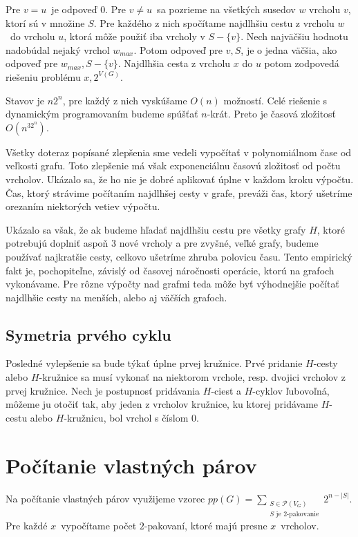 Pre $v = u$ je odpoveď $0$. Pre $v \neq u$ sa pozrieme na všetkých susedov $w$ vrcholu $v$,
ktorí sú v množine $S$. Pre každého z nich spočítame najdlhšiu cestu z vrcholu $w$ do vrcholu
$u$, ktorá môže použiť iba vrcholy v $S - \{v\}$. Nech najväčšiu hodnotu nadobúdal nejaký vrchol
$w_{max}$. Potom odpoveď pre $v, S$, je o jedna väčšia, ako odpoveď pre $w_{max}, S - \{v\}$.
Najdlhšia cesta z vrcholu $x$ do $u$ potom zodpovedá riešeniu problému $x, 2^{V(G)}$.

Stavov je $n2^n$, pre každý z nich vyskúšame $O(n)$ možností. Celé riešenie s dynamickým
programovaním budeme spúšťať $n$-krát. Preto je časová zložitosť $O(n^32^n)$.

Všetky doteraz popísané zlepšenia sme vedeli vypočítať v polynomiálnom čase od veľkosti grafu.
Toto zlepšenie má však exponenciálnu časovú zložitosť od počtu vrcholov. Ukázalo sa,
že ho nie je dobré aplikovať úplne v každom kroku výpočtu. Čas, ktorý strávime počítaním
najdlhšej cesty v grafe, preváži čas, ktorý ušetríme orezaním niektorých vetiev výpočtu.

Ukázalo sa však, že ak budeme hľadať najdlhšiu cestu pre všetky grafy $H$, ktoré potrebujú
doplniť aspoň $3$ nové vrcholy a pre zvyšné, veľké grafy, budeme používať najkratšie cesty,
celkovo ušetríme zhruba polovicu času. Tento empirický fakt je, pochopiteľne, závislý od
časovej náročnosti operácie, ktorú na grafoch vykonávame. Pre rôzne výpočty nad grafmi
teda môže byť výhodnejšie počítať najdlhšie cesty na menších, alebo aj väčších grafoch.

\subsection{Symetria prvého cyklu}

Posledné vylepšenie sa bude týkať úplne prvej kružnice. Prvé pridanie $H$-cesty alebo $H$-kružnice
sa musí vykonať na niektorom vrchole, resp. dvojici vrcholov z prvej kružnice.
Nech je postupnosť pridávania $H$-ciest a $H$-cyklov ľubovoľná, môžeme ju otočiť tak, aby jeden
z vrcholov kružnice, ku ktorej pridávame $H$-cestu alebo $H$-kružnicu,
bol vrchol s číslom $0$.

\section{Počítanie vlastných párov}

Na počítanie vlastných párov využijeme vzorec $pp(G) = \sum \limits_{\substack{S \in \mathcal{P}(V_G) \\ S \textrm{ je } 2 \textrm{-pakovanie}}} 2^{n - |S|}$.
Pre každé $x$ vypočítame počet $2$-pakovaní, ktoré majú presne $x$ vrcholov.

